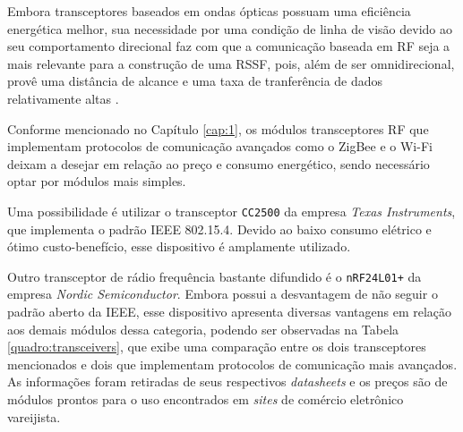 Embora transceptores baseados em ondas ópticas possuam uma eficiência energética melhor, sua necessidade por
uma condição de linha de visão devido ao seu comportamento direcional faz com que a comunicação baseada em RF
seja a mais relevante para a construção de uma RSSF, pois, além de ser omnidirecional, provê uma distância de
alcance e uma taxa de tranferência de dados relativamente altas \cite{kuorilehto2007,karl_willig2005}.

Conforme mencionado no Capítulo \ref{cap:1}, os módulos transceptores RF que implementam protocolos de
comunicação avançados como o ZigBee e o Wi-Fi deixam a desejar em relação ao preço e consumo energético,
sendo necessário optar por módulos mais simples.

Uma possibilidade é utilizar o transceptor \texttt{CC2500} da empresa \textit{Texas Instruments}, que
implementa o padrão IEEE 802.15.4. Devido ao baixo consumo elétrico e ótimo custo-benefício, esse dispositivo
é amplamente utilizado.

Outro transceptor de rádio frequência bastante difundido é o \texttt{nRF24L01+} da empresa \textit{Nordic
Semiconductor}. Embora possui a desvantagem de não seguir o padrão aberto da IEEE, esse dispositivo apresenta
diversas vantagens em relação aos demais módulos dessa categoria, podendo ser observadas na Tabela
\ref{quadro:transceivers}, que exibe uma comparação entre os dois transceptores mencionados e dois que
implementam protocolos de comunicação mais avançados. As informações foram retiradas de seus respectivos
\textit{datasheets} e os preços são de módulos prontos para o uso encontrados em \textit{sites} de comércio
eletrônico vareijista.

